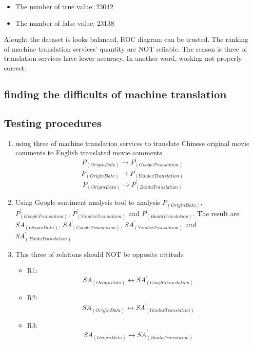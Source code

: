 \documentclass[conference]{IEEEtran}
\begin{document}
\begin{CJK*}{UTF8}{gbsn}
\begin{enumerate}
\begin{itemize}
\item The number of true value: 23042
\item The number of false value: 23138
\end{itemize}

\end{enumerate}
Alought the dataset is looks balanced, ROC diagram can be trusted. The ranking
of machine translation services' quantity are NOT reliable. The reason is three of translation services
have lower accuracy. In another word, working not properly correct.

\subsection{finding the difficults of machine translation}
\subsection{Testing procedures}
\begin{enumerate}
    \item using three of machine translation services to translate Chinese
    original movie comments to English translated movie comments.
    $$P_{(Origin Data)} \rightarrow P^{\prime}_{(Google Translation)}$$
    $$P_{(Origin Data)} \rightarrow P^{\prime}_{(Yandex Translation)}$$
    $$P_{(Origin Data)} \rightarrow P^{\prime}_{(Baidu Translation)}$$
  \item Using Google sentiment analysis tool to analysis $P_{(Origin Data)}$,
    $P^{\prime}_{(Google Translation)}$, $ P^{\prime}_{(Yandex Translation)}$ and $
    P^{\prime}_{(Baidu Translation)}$. The result are $SA_{(Origin Data)}$,
    $SA^{\prime}_{(Google Translation)}$, $ SA^{\prime}_{(Yandex Translation)}$ and $
    SA^{\prime}_{(Baidu Translation)}$
  \item This three of relations should NOT be opposite attitude
\begin{itemize}
  \item R1: $$SA_{(Origin Data)} \longleftrightarrow SA^{\prime}_{(Google Translation)}$$
  \item R2: $$SA_{(Origin Data)} \longleftrightarrow SA^{\prime}_{(Yandex Translation)}$$
  \item R3: $$SA_{(Origin Data)} \longleftrightarrow SA^{\prime}_{(Baidu Translation)}$$
\end{itemize}

\end{enumerate}


\end{CJK*}
\end{document}
